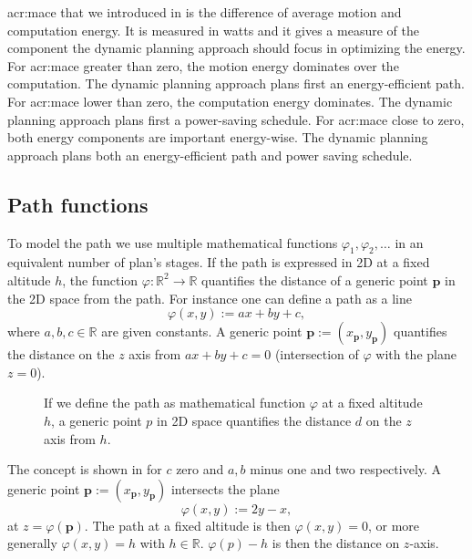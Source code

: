 \Gls{acr:mace} that we introduced in  is the difference of average motion and computation energy. It is measured in watts and it gives a measure of the component the dynamic planning approach should focus in optimizing the energy. For \Gls{acr:mace} greater than zero, the motion energy dominates over the computation. The dynamic planning approach plans first an energy-efficient path. For \Gls{acr:mace} lower than zero, the computation energy dominates. The dynamic planning approach plans first a power-saving schedule. For \Gls{acr:mace} close to zero, both energy components are important energy-wise. The dynamic planning approach plans both an energy-efficient path and power saving schedule.

\subsection{Path functions}

To model the path we use multiple mathematical functions $\varphi_1,\varphi_2,\dots$ in an equivalent number of plan's stages. If the path is expressed in 2D at a fixed altitude $h$, the function $\varphi:\mathbb{R}^2\rightarrow\mathbb{R}$ quantifies the distance of a generic point $\mathbf{p}$ in the 2D space from the path. For instance one can define a path as a line
\begin{equation}\label{eq:basic-path}
  \varphi(x,y):=ax+by+c,
\end{equation}
where $a,b,c\in\mathbb{R}$ are given constants. A generic point $\mathbf{p}:=(x_{\mathbf{p}},y_{\mathbf{p}})$ quantifies the distance on the $z$ axis from $ax+by+c=0$ (intersection of $\varphi$ with the plane $z=0$).

\begin{figure}[t]
  \centering
  
  \caption[Concept of the path and generic point in space]{If we define the path as mathematical function $\varphi$ at a fixed altitude $h$, a generic point $p$ in 2D space quantifies the distance $d$ on the $z$ axis from $h$.}
  \label{fig:plot1}
\end{figure}

The concept is shown in  for $c$ zero and $a,b$ minus one and two respectively. A generic point $\mathbf{p}:=(x_{\mathbf{p}},y_{\mathbf{p}})$ intersects the plane
\begin{equation}
  \varphi(x,y):=2y-x,
\end{equation}
at $z=\varphi(\mathbf{p})$. The path at a fixed altitude is then $\varphi(x,y)=0$, or more generally $\varphi(x,y)=h$ with $h\in\mathbb{R}$. $\varphi(p)-h$ is then the distance on $z$-axis.

